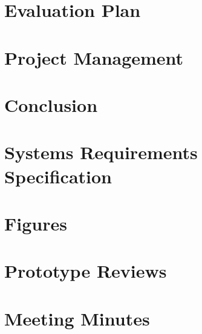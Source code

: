 \documentclass[12pt]{report}
\newcommand\blankpage{%
    \null
    \thispagestyle{empty}%
    \addtocounter{page}{-1}%
    \newpage}
\begin{document}
\chapter{Evaluation Plan}



\chapter{Project Management}



\chapter{Conclusion}



\afterpage{\blankpage}

\begin{appendices}

\chapter{Systems Requirements Specification}



\chapter{Figures}



\chapter{Prototype Reviews} \label{Prototype Reviews}



\afterpage{\blankpage}
\chapter{Meeting Minutes}


\end{appendices}

% 
% 
\printbibliography
\end{document}
